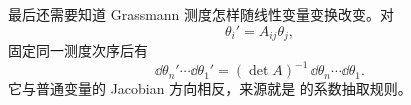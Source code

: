 最后还需要知道 Grassmann 测度怎样随线性变量变换改变。对
\begin{equation}
\theta_i'=A_{ij}\theta_j,
\label{eq:berezin-linear-transform-dp68}
\end{equation}
固定同一测度次序后有
\begin{equation}
{
\dd\theta_n'\cdots\dd\theta_1'
=(\det A)^{-1}\,
\dd\theta_n\cdots\dd\theta_1.}
\label{eq:berezin-jacobian-dp21}
\end{equation}
它与普通变量的 Jacobian 方向相反，来源就是 的系数抽取规则。
